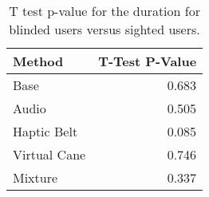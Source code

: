 
\begin{table}[!htb]
\centering
\caption{T test p-value for the duration for blinded users versus sighted users.}
\label{tab:ttest_duration}
\begin{tabular}{lr}
\toprule
      Method &  T-Test P-Value \\
\midrule
        Base &           0.683 \\
       Audio &           0.505 \\
 Haptic Belt &           0.085 \\
Virtual Cane &           0.746 \\
     Mixture &           0.337 \\
\bottomrule
\end{tabular}
\end{table}

